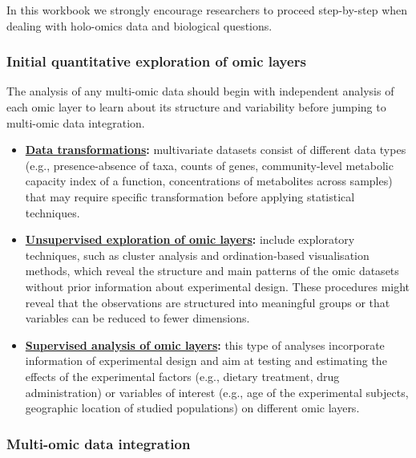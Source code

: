 \documentclass[
]{book}
\providecommand{\tightlist}{%
  \setlength{\itemsep}{0pt}\setlength{\parskip}{0pt}}
\begin{document}
In this workbook we strongly encourage researchers to proceed step-by-step when dealing with holo-omics data and biological questions.

\hypertarget{initial-quantitative-exploration-of-omic-layers}{%
\subsubsection*{Initial quantitative exploration of omic layers}\label{initial-quantitative-exploration-of-omic-layers}}

The analysis of any multi-omic data should begin with independent analysis of each omic layer to learn about its structure and variability before jumping to multi-omic data integration.

\begin{itemize}
\tightlist
\item
  \textbf{\protect\hyperlink{data-transformations}{Data transformations}:} multivariate datasets consist of different data types (e.g., presence-absence of taxa, counts of genes, community-level metabolic capacity index of a function, concentrations of metabolites across samples) that may require specific transformation before applying statistical techniques.
\item
  \textbf{\protect\hyperlink{unsupervised-exploration}{Unsupervised exploration of omic layers}:} include exploratory techniques, such as cluster analysis and ordination-based visualisation methods, which reveal the structure and main patterns of the omic datasets without prior information about experimental design. These procedures might reveal that the observations are structured into meaningful groups or that variables can be reduced to fewer dimensions.
\item
  \textbf{\protect\hyperlink{supervised-analysis}{Supervised analysis of omic layers}:} this type of analyses incorporate information of experimental design and aim at testing and estimating the effects of the experimental factors (e.g., dietary treatment, drug administration) or variables of interest (e.g., age of the experimental subjects, geographic location of studied populations) on different omic layers.
\end{itemize}

\hypertarget{multi-omic-data-integration}{%
\subsubsection*{Multi-omic data integration}\label{multi-omic-data-integration}}
\end{document}
